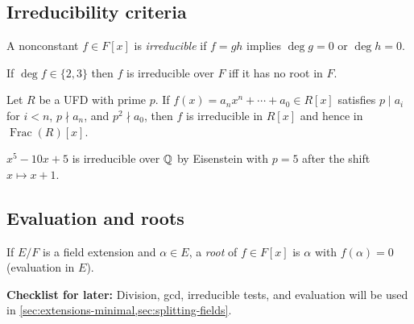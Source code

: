 \subsection{Irreducibility criteria}
\begin{definition}
A nonconstant $f\in F[x]$ is \emph{irreducible} if $f=gh$ implies $\deg g=0$ or $\deg h=0$.
\end{definition}
\begin{proposition}
If $\deg f\in\{2,3\}$ then $f$ is irreducible over $F$ iff it has no root in $F$.
\end{proposition}
\begin{theorem}[Eisenstein]
Let $R$ be a UFD with prime $p$. If $f(x)=a_nx^n+\cdots+a_0\in R[x]$ satisfies
$p\mid a_i$ for $i<n$, $p\nmid a_n$, and $p^2\nmid a_0$, then $f$ is irreducible in $R[x]$ and hence in $\operatorname{Frac}(R)[x]$.
\end{theorem}
\begin{example}
$x^5-10x+5$ is irreducible over $\mathbb{Q}$ by Eisenstein with $p=5$ after the shift $x\mapsto x+1$.
\end{example}

\subsection{Evaluation and roots}
\begin{definition}
If $E/F$ is a field extension and $\alpha\in E$, a \emph{root} of $f\in F[x]$ is $\alpha$ with $f(\alpha)=0$ (evaluation in $E$).
\end{definition}

\bigskip
\noindent\textbf{Checklist for later:}
Division, gcd, irreducible tests, and evaluation will be used in \cref{sec:extensions-minimal,sec:splitting-fields}.
